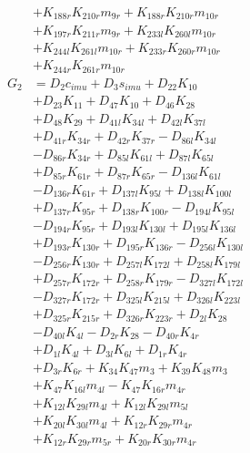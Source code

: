 \begin{multicols}{2}
\begin{align}
&+ K_{188r}K_{210r}m_{9r} + K_{188r}K_{210r}m_{10r}  \nonumber \\
&+ K_{197r}K_{211r}m_{9r} + K_{233l}K_{260l}m_{10r}  \nonumber \\
&+ K_{244l}K_{261l}m_{10r} + K_{233r}K_{260r}m_{10r}  \nonumber \\
&+ K_{244r}K_{261r}m_{10r} \nonumber \\
G_{2} &= D_{2}c_{imu} + D_{3}s_{imu} + D_{22}K_{10}  \nonumber \\
&+ D_{23}K_{11} + D_{47}K_{10} + D_{46}K_{28}  \nonumber \\
&+ D_{48}K_{29} + D_{41l}K_{34l} + D_{42l}K_{37l}  \nonumber \\
&+ D_{41r}K_{34r} + D_{42r}K_{37r} - D_{86l}K_{34l}  \nonumber \\
&- D_{86r}K_{34r} + D_{85l}K_{61l} + D_{87l}K_{65l}  \nonumber \\
&+ D_{85r}K_{61r} + D_{87r}K_{65r} - D_{136l}K_{61l}  \nonumber \\
&- D_{136r}K_{61r} + D_{137l}K_{95l} + D_{138l}K_{100l}  \nonumber \\
&+ D_{137r}K_{95r} + D_{138r}K_{100r} - D_{194l}K_{95l}  \nonumber \\
&- D_{194r}K_{95r} + D_{193l}K_{130l} + D_{195l}K_{136l}  \nonumber \\
&+ D_{193r}K_{130r} + D_{195r}K_{136r} - D_{256l}K_{130l}  \nonumber \\
&- D_{256r}K_{130r} + D_{257l}K_{172l} + D_{258l}K_{179l}  \nonumber \\
&+ D_{257r}K_{172r} + D_{258r}K_{179r} - D_{327l}K_{172l}  \nonumber \\
&- D_{327r}K_{172r} + D_{325l}K_{215l} + D_{326l}K_{223l}  \nonumber \\
&+ D_{325r}K_{215r} + D_{326r}K_{223r} + D_{2l}K_{28}  \nonumber \\
&- D_{40l}K_{4l} - D_{2r}K_{28} - D_{40r}K_{4r}  \nonumber \\
&+ D_{1l}K_{4l} + D_{3l}K_{6l} + D_{1r}K_{4r}  \nonumber \\
&+ D_{3r}K_{6r} + K_{34}K_{47}m_3 + K_{39}K_{48}m_3  \nonumber \\
&+ K_{47}K_{16l}m_{4l} - K_{47}K_{16r}m_{4r}  \nonumber \\
&+ K_{12l}K_{29l}m_{4l} + K_{12l}K_{29l}m_{5l}  \nonumber \\
&+ K_{20l}K_{30l}m_{4l} + K_{12r}K_{29r}m_{4r}  \nonumber \\
&+ K_{12r}K_{29r}m_{5r} + K_{20r}K_{30r}m_{4r}  \nonumber \\

\end{align}
\end{multicols}
